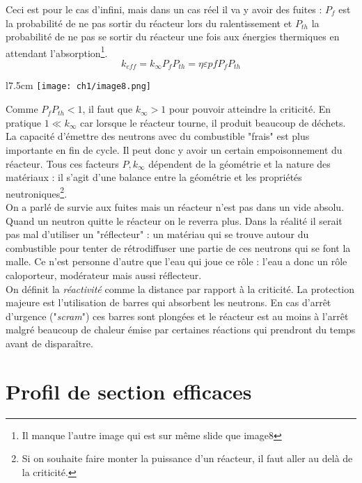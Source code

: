 Ceci est pour le cas d'infini, mais dans un cas réel il va y avoir des fuites : $P_f$ est la 
probabilité de ne pas sortir du réacteur lors du ralentissement et $P_{th}$ la probabilité de ne pas se sortir
du réacteur une fois aux énergies thermiques en attendant l'absorption\footnote{Il manque l'autre image qui est sur
même slide que image8}. 
\begin{equation}
k_{eff} = k_\infty P_fP_{th} = \eta \varepsilon pfP_fP_{th}
\end{equation}

	\begin{wrapfigure}[11]{l}{7.5cm}
	\vspace{-5mm}
	\texttt{[image: ch1/image8.png]}
	\end{wrapfigure}
Comme $P_fP_{th} < 1$, il faut que $k_\infty > 1$ pour pouvoir atteindre la criticité. En pratique $1 \ll k_\infty$ car lorsque le 
réacteur tourne, il produit beaucoup de déchets. La capacité d'émettre des neutrons avec du 
combustible "frais" est plus importante en fin de cycle. Il peut donc y avoir un certain 
empoisonnement du réacteur. Tous ces facteurs $P,k_\infty$ dépendent de la géométrie et la 
nature des matériaux : il s'agit d'une balance entre la géométrie et les propriétés 
neutroniques\footnote{Si on souhaite faire monter la puissance d'un réacteur, il faut 
aller au delà de la criticité.}.\\


On a parlé de survie aux fuites  mais un réacteur n'est pas dans un vide absolu. Quand un 
neutron quitte le réacteur on le reverra plus. Dans la réalité il serait pas mal d'utiliser 
un "réflecteur" : un matériau qui se trouve autour du combustible pour tenter de 
rétrodiffuser une partie de ces neutrons qui se font la malle. Ce n'est personne d'autre 
que l'eau qui joue ce rôle : l'eau a donc un rôle caloporteur, modérateur mais aussi réflecteur. \\

On définit la \textit{réactivité} comme la distance par rapport à la criticité. La protection 
majeure est l'utilisation de barres qui absorbent les neutrons. En cas d'arrêt d'urgence 
("\textit{scram}") ces barres sont plongées et le réacteur est au moins à l'arrêt malgré beaucoup de
chaleur émise par certaines réactions qui prendront du temps avant de disparaître.

\section{Profil de section efficaces}
